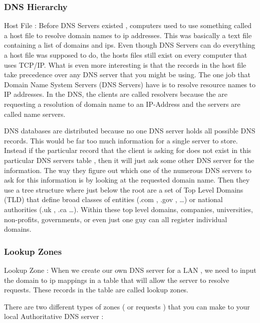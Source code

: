 \subsubsection{DNS Hierarchy}
\label{sssec:dns_hierarchy}


Host File : Before DNS Servers existed , computers used to use something called
a host file to resolve domain names to ip addresses. This was basically a text
file containing a list of domains and ips. Even though DNS Servers can do
everything a host file was supposed to do,  the hosts files still exist on every
computer that uses TCP/IP. What is even more interesting is that the records in
the host file take precedence over any DNS server that you might be using.
The one job that Domain Name System Servers (DNS Servers) have  is
to resolve resource names to IP addresses. In the DNS, the clients are called
resolvers because the are requesting a resolution of domain name to an
IP-Address and the servers are called name servers.

DNS databases are distributed because no one DNS server holds all possible DNS
records. This would be far too much information for a single server to store.
Instead if the particular record that the client is asking for does not exist in
this particular DNS servers table , then it will just ask some other DNS server
for the information. The way they figure out which one of the numerous DNS
servers to ask for this information is by looking at the requested domain name.
Then they use a tree structure where just below the root are a set of Top Level
Domains (TLD) that define broad classes of entities (.com , .gov , \ldots) or
national authorities (.uk , .ca \ldots). Within these top level domains,
companies, universities, non-profits, governments, or even just one guy can all
register individual domains.
\subsubsectionend

\subsubsection{Lookup Zones}
\label{sssec:lookup_zones}

Lookup Zone : When we create our own DNS server for a LAN , we need to input the
domain to ip mappings in a table that will allow the server to resolve requests.
These records in the table are called lookup zones.

There are two different types of zones ( or requests ) that you can make to your
local Authoritative DNS server :

